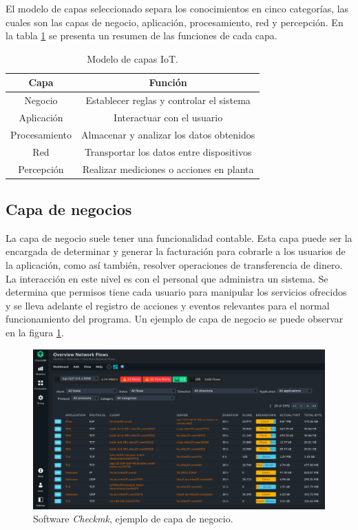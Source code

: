El modelo de capas seleccionado separa los conocimientos en cinco categorías, las cuales son las capas de negocio, aplicación, procesamiento, red y percepción.
En la tabla \ref{tab:modeloCapas} se presenta un resumen de las funciones de cada capa.

\begin{table}[h]
	\centering
	\caption{\label{tab:modeloCapas}Modelo de capas IoT.}
	\begin{tabular}{c c}
		\toprule
		\textbf{Capa} & \textbf{Función}                         \\
		\midrule
		Negocio       & Establecer reglas y controlar el sistema \\
		Aplicación    & Interactuar con el usuario               \\
		Procesamiento & Almacenar y analizar los datos obtenidos \\
		Red           & Transportar los datos entre dispositivos \\
		Percepción    & Realizar mediciones o acciones en planta \\
		\bottomrule
		\hline
	\end{tabular}
\end{table}

\subsection{Capa de negocios}
La capa de negocio suele tener una funcionalidad contable.
Esta capa puede ser la encargada de determinar y generar la facturación para cobrarle a los usuarios de la aplicación, como así también, resolver operaciones de transferencia de dinero.
La interacción en este nivel es con el personal que administra un sistema.
Se determina que permisos tiene cada usuario para manipular los servicios ofrecidos y se lleva adelante el registro de acciones y eventos relevantes para el normal funcionamiento del programa.
Un ejemplo de capa de negocio se puede observar en la figura \ref{fig:ch1EjemploNegocio}.

\begin{figure}[h]
	\centering
	\includegraphics[width=\textwidth]{./Figures/ch1EjemploNegocio.png}
	\caption{Software \emph{Checkmk}, ejemplo de capa de negocio. \citep{WEBSITE:checkmk}}
	\label{fig:ch1EjemploNegocio}
\end{figure}


